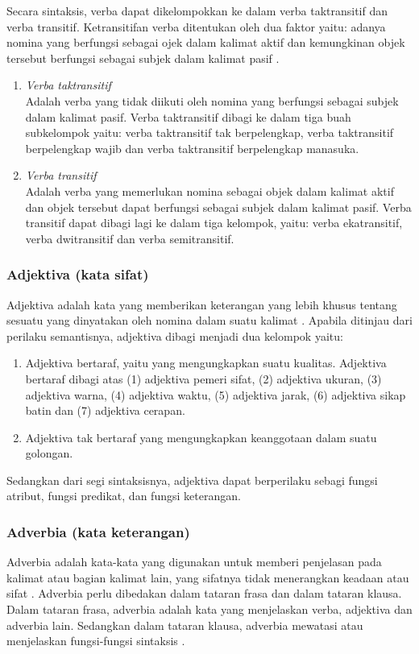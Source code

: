 Secara sintaksis, verba dapat dikelompokkan ke dalam verba taktransitif dan verba transitif. Ketransitifan verba ditentukan oleh dua faktor yaitu: adanya nomina yang berfungsi sebagai ojek dalam kalimat aktif dan kemungkinan objek tersebut berfungsi sebagai subjek dalam kalimat pasif \citep{alwi}.
\begin{enumerate}
	\item \emph{Verba taktransitif}\\
	Adalah verba yang tidak diikuti oleh nomina yang berfungsi sebagai subjek dalam kalimat pasif. Verba taktransitif dibagi ke dalam tiga buah subkelompok yaitu: verba taktransitif tak berpelengkap, verba taktransitif berpelengkap wajib dan verba taktransitif berpelengkap manasuka.
	\item \emph{Verba transitif}\\
	Adalah verba yang memerlukan nomina sebagai objek dalam kalimat aktif dan objek tersebut dapat berfungsi sebagai subjek dalam kalimat pasif. Verba transitif dapat dibagi lagi ke dalam tiga kelompok, yaitu: verba ekatransitif, verba dwitransitif dan verba semitransitif.
\end{enumerate}

\subsubsection{Adjektiva (kata sifat)}
Adjektiva adalah kata yang memberikan keterangan yang lebih khusus tentang sesuatu yang  dinyatakan oleh nomina dalam suatu kalimat \citep{alwi}. Apabila ditinjau dari perilaku semantisnya, adjektiva dibagi menjadi dua kelompok yaitu:
\begin{enumerate}
	\item Adjektiva bertaraf, yaitu yang mengungkapkan suatu kualitas. Adjektiva bertaraf dibagi atas (1) adjektiva pemeri sifat, (2) adjektiva ukuran, (3) adjektiva warna, (4) adjektiva waktu, (5) adjektiva jarak, (6) adjektiva sikap batin dan (7) adjektiva cerapan.
	\item Adjektiva tak bertaraf yang mengungkapkan keanggotaan dalam suatu golongan.
\end{enumerate}
Sedangkan dari segi sintaksisnya, adjektiva dapat berperilaku sebagi fungsi atribut, fungsi predikat, dan fungsi keterangan.

\subsubsection{Adverbia (kata keterangan)}
Adverbia adalah kata-kata yang digunakan untuk memberi penjelasan pada kalimat atau bagian kalimat lain, yang sifatnya tidak menerangkan keadaan atau sifat \citep{chaer}. Adverbia perlu dibedakan dalam tataran frasa dan dalam tataran klausa. Dalam tataran frasa, adverbia adalah kata yang menjelaskan verba, adjektiva dan adverbia lain. Sedangkan dalam tataran klausa, adverbia mewatasi atau menjelaskan fungsi-fungsi sintaksis \citep{alwi}.

